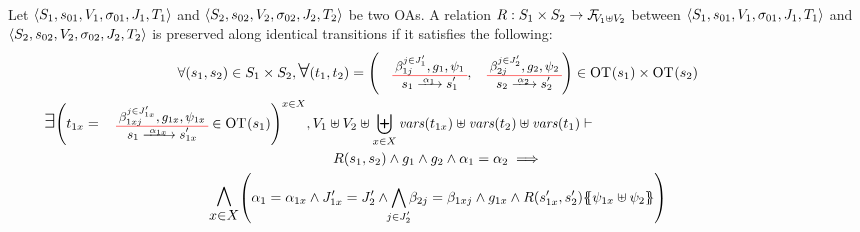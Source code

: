 \documentclass[runningheads]{llncs}
\begin{document}
\begin{definition}\label{def:preservation} \\
Let \(\OAg[1]\) and \(\OAg[2]\) be two OAs.
A relation \(R: S_1 \times S_2 \to \rformulas[V_1 \uplus V_2]\) between  \(\OAg[1]\) and \(\OAg[2]\)
  is preserved along identical transitions if  it satisfies the following:
\begin{multline*}
\forall \mpar{s_1, s_2} \in S_1 \times S_2, \bigsymb{\forall} \mpar{t_1, t_2} = \mpar{\OTx{1}{}{1}{1}, \OTx{2}{}{2}{2}} \in \fOT{s_1} \times \fOT{s_2} \\ 
\bigsymb{\bigexists} 
\mpar{t_{1x} = \OTx{1}{x}{1x}{1x} \in \fOT{s_1}}^{x \in X},
 V_1 \uplus V_2 \uplus \biguplus_{x\in X}\fvars{t_{1x}} \uplus \fvars{t_2} \uplus \fvars{t_1} \vdash \hspace{6cm}\\  R\mpar{s_1, s_2} \wedge 	g_1 \wedge g_2 \wedge \alpha_1 = \alpha_2 
\implies \\
\bigsymb{\bigwedge_{x\in X}}
\mpar{
\alpha_1=\alpha_{1 x}  \land J'_{1x}= J'_2 \land \bigwedge_\subbox{j \in J'_2 } \beta_{2j} = \beta_{1xj}\land g_{1 x}\land
 R\mpar{s'_{1 x}, s'_2}\psubst{\psi_{1 x} \uplus \psi_2}}\\
\end{multline*}
\end{definition}

\medskip
\end{document}
